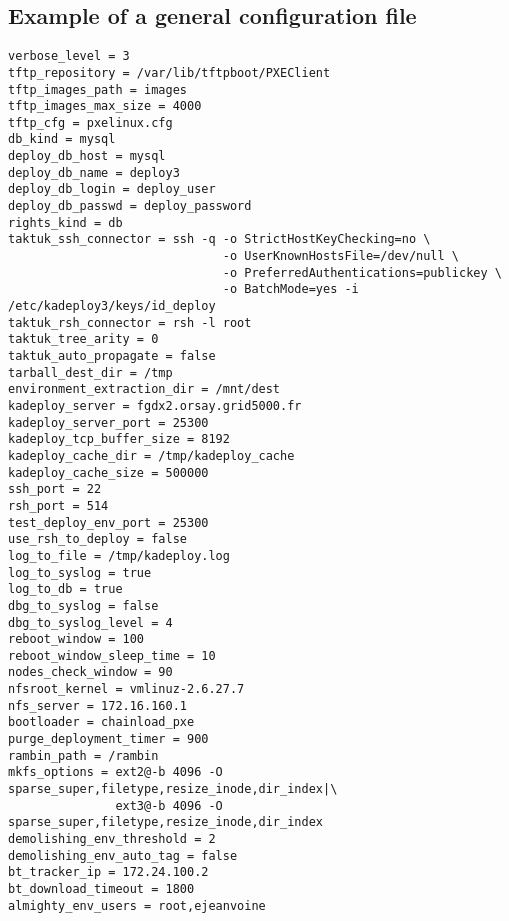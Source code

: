 \documentclass[a4wide,10pt,oneside]{book}
\begin{document}
\subsection{Example of a general configuration file}
\begin{small}
\begin{verbatim}
verbose_level = 3
tftp_repository = /var/lib/tftpboot/PXEClient
tftp_images_path = images
tftp_images_max_size = 4000
tftp_cfg = pxelinux.cfg
db_kind = mysql
deploy_db_host = mysql
deploy_db_name = deploy3
deploy_db_login = deploy_user
deploy_db_passwd = deploy_password
rights_kind = db
taktuk_ssh_connector = ssh -q -o StrictHostKeyChecking=no \
                              -o UserKnownHostsFile=/dev/null \
                              -o PreferredAuthentications=publickey \
                              -o BatchMode=yes -i /etc/kadeploy3/keys/id_deploy
taktuk_rsh_connector = rsh -l root
taktuk_tree_arity = 0
taktuk_auto_propagate = false
tarball_dest_dir = /tmp
environment_extraction_dir = /mnt/dest
kadeploy_server = fgdx2.orsay.grid5000.fr
kadeploy_server_port = 25300
kadeploy_tcp_buffer_size = 8192
kadeploy_cache_dir = /tmp/kadeploy_cache
kadeploy_cache_size = 500000
ssh_port = 22
rsh_port = 514
test_deploy_env_port = 25300
use_rsh_to_deploy = false
log_to_file = /tmp/kadeploy.log
log_to_syslog = true
log_to_db = true
dbg_to_syslog = false
dbg_to_syslog_level = 4
reboot_window = 100
reboot_window_sleep_time = 10
nodes_check_window = 90
nfsroot_kernel = vmlinuz-2.6.27.7
nfs_server = 172.16.160.1
bootloader = chainload_pxe
purge_deployment_timer = 900
rambin_path = /rambin
mkfs_options = ext2@-b 4096 -O sparse_super,filetype,resize_inode,dir_index|\
               ext3@-b 4096 -O sparse_super,filetype,resize_inode,dir_index
demolishing_env_threshold = 2
demolishing_env_auto_tag = false
bt_tracker_ip = 172.24.100.2
bt_download_timeout = 1800
almighty_env_users = root,ejeanvoine
\end{verbatim}
\end{small}
\end{document}

